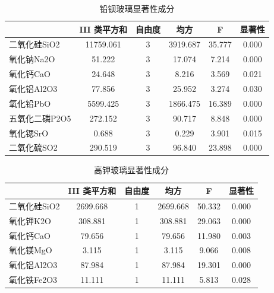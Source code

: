\begin{table}[!htp]
\centering
\caption{铅钡玻璃显著性成分}
\begin{tabular}{lccccc}
\toprule
          & III 类平方和  & 自由度 & 均方       & F      & 显著性    \\
\midrule
二氧化硅SiO2  & 11759.061 & 3   & 3919.687 & 35.777 & 0.000  \\
氧化钠Na2O   & 51.222    & 3   & 17.074   & 7.214  & 0.000  \\
氧化钙CaO    & 24.648    & 3   & 8.216    & 3.569  & 0.021  \\
氧化铝Al2O3  & 77.856    & 3   & 25.952   & 3.274  & 0.030  \\
氧化铅PbO    & 5599.425  & 3   & 1866.475 & 16.389 & 0.000  \\
五氧化二磷P2O5 & 272.152   & 3   & 90.717   & 8.848  & 0.000  \\
氧化锶SrO    & 0.688     & 3   & 0.229    & 3.901  & 0.015  \\
二氧化硫SO2   & 290.519   & 3   & 96.840   & 23.898 & 0.000  \\
\bottomrule
\end{tabular}
\end{table}


\begin{table}
\centering
\caption{高钾玻璃显著性成分}
\begin{tabular}{lccccc}
\toprule
         & III 类平方和 & 自由度 & 均方       & F      & 显著性    \\
\hline
二氧化硅SiO2 & 2699.668 & 1   & 2699.668 & 50.332 & 0.000  \\
氧化钾K2O   & 308.881  & 1   & 308.881  & 29.063 & 0.000  \\
氧化钙CaO   & 79.656   & 1   & 79.656   & 11.980 & 0.003  \\
氧化镁MgO   & 3.115    & 1   & 3.115    & 9.066  & 0.008  \\
氧化铝Al2O3 & 87.984   & 1   & 87.984   & 19.301 & 0.000  \\
氧化铁Fe2O3 & 11.111   & 1   & 11.111   & 5.813  & 0.028  \\
\bottomrule
\end{tabular}
\end{table}



